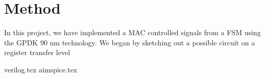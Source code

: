 \section{Method}
In this project, we have implemented a MAC controlled signals from a FSM using the GPDK 90 nm technology. We began by sketching out a possible circuit on a register transfer level


{verilog.tex}
{aimspice.tex}